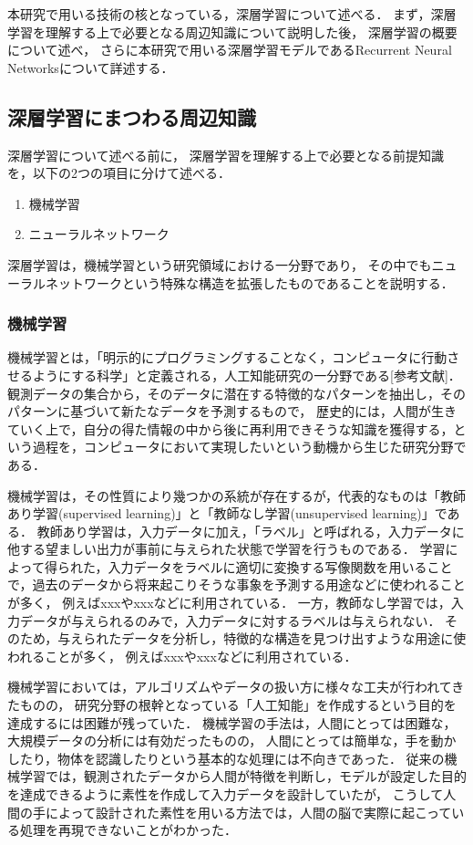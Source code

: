 本研究で用いる技術の核となっている，深層学習について述べる．
まず，深層学習を理解する上で必要となる周辺知識について説明した後，
深層学習の概要について述べ，
さらに本研究で用いる深層学習モデルであるRecurrent Neural Networksについて詳述する．

\subsection{深層学習にまつわる周辺知識}
深層学習について述べる前に，
深層学習を理解する上で必要となる前提知識を，以下の2つの項目に分けて述べる．

\begin{enumerate}
	\item 機械学習
	\item ニューラルネットワーク
\end{enumerate}

深層学習は，機械学習という研究領域における一分野であり，
その中でもニューラルネットワークという特殊な構造を拡張したものであることを説明する．


\subsubsection{機械学習}
機械学習とは，「明示的にプログラミングすることなく，コンピュータに行動させるようにする科学」と定義される，人工知能研究の一分野である[参考文献]．
観測データの集合から，そのデータに潜在する特徴的なパターンを抽出し，そのパターンに基づいて新たなデータを予測するもので，
歴史的には，人間が生きていく上で，自分の得た情報の中から後に再利用できそうな知識を獲得する，という過程を，コンピュータにおいて実現したいという動機から生じた研究分野である．


機械学習は，その性質により幾つかの系統が存在するが，代表的なものは「教師あり学習(supervised learning)」と「教師なし学習(unsupervised learning)」である．
教師あり学習は，入力データに加え，「ラベル」と呼ばれる，入力データに他する望ましい出力が事前に与えられた状態で学習を行うものである．
学習によって得られた，入力データをラベルに適切に変換する写像関数を用いることで，過去のデータから将来起こりそうな事象を予測する用途などに使われることが多く，
例えばxxxやxxxなどに利用されている．
一方，教師なし学習では，入力データが与えられるのみで，入力データに対するラベルは与えられない．
そのため，与えられたデータを分析し，特徴的な構造を見つけ出すような用途に使われることが多く，
例えばxxxやxxxなどに利用されている．


機械学習においては，アルゴリズムやデータの扱い方に様々な工夫が行われてきたものの，
研究分野の根幹となっている「人工知能」を作成するという目的を達成するには困難が残っていた．
機械学習の手法は，人間にとっては困難な，大規模データの分析には有効だったものの，
人間にとっては簡単な，手を動かしたり，物体を認識したりという基本的な処理には不向きであった．
従来の機械学習では，観測されたデータから人間が特徴を判断し，モデルが設定した目的を達成できるように素性を作成して入力データを設計していたが，
こうして人間の手によって設計された素性を用いる方法では，人間の脳で実際に起こっている処理を再現できないことがわかった．

